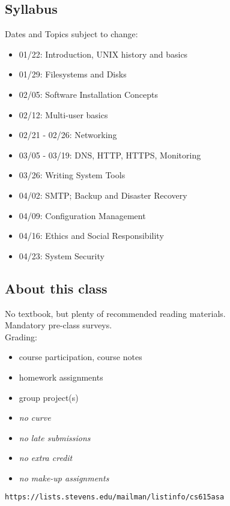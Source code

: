\documentclass[xga]{xdvislides}
\begin{document}
\subsection{Syllabus}
Dates and Topics subject to change:
\begin{itemize}
	\item 01/22: Introduction, UNIX history and basics
	\item 01/29: Filesystems and Disks
	\item 02/05: Software Installation Concepts
	\item 02/12: Multi-user basics
	\item 02/21 - 02/26: Networking
	\item 03/05 - 03/19: DNS, HTTP, HTTPS, Monitoring
	\item 03/26: Writing System Tools
	\item 04/02: SMTP; Backup and Disaster Recovery
	\item 04/09: Configuration Management
	\item 04/16: Ethics and Social Responsibility
	\item 04/23: System Security
\end{itemize}

\subsection{About this class}
No textbook, but plenty of recommended reading materials. \\

Mandatory pre-class surveys. \\

Grading:
\begin{itemize}
	\item course participation, course notes
	\item homework assignments
	\item group project(s)
	\item {\em no curve}
	\item {\em no late submissions}
	\item {\em no extra credit}
	\item {\em no make-up assignments}
\end{itemize}

\verb+https://lists.stevens.edu/mailman/listinfo/cs615asa+
\end{document}
